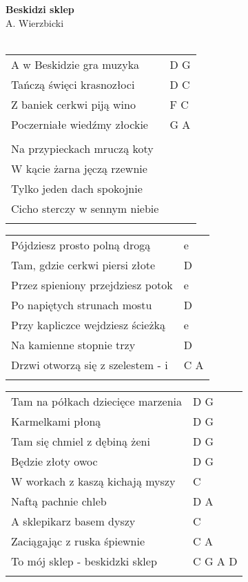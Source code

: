 \documentclass[a5paper]{article}
\begin{document}


\noindent
\fontsize{12pt}{15pt}\selectfont
\textbf{Beskidzi sklep} \\
\fontsize{8pt}{10pt}\selectfont
A. Wierzbicki \\ \\
\fontsize{10pt}{12pt}\selectfont
{}
\begin{tabular}{@{}p{8.5cm}p{3cm}@{}}
A w Beskidzie gra muzyka & D G \\
Tańczą święci krasnozłoci & D C \\
Z baniek cerkwi piją wino & F C \\
Poczerniałe wiedźmy złockie & G A \\ \\
 
Na przypieckach mruczą koty \\
W kącie żarna jęczą rzewnie \\
Tylko jeden dach spokojnie \\
Cicho sterczy w sennym niebie \\ \\
\end{tabular}

\noindent
\begin{tabular}{@{}p{7.5cm}p{3cm}@{}} 
Pójdziesz prosto polną drogą & e \\
Tam, gdzie cerkwi piersi złote & D \\
Przez spieniony przejdziesz potok & e \\
Po napiętych strunach mostu & D \\
Przy kapliczce wejdziesz ścieżką & e \\
Na kamienne stopnie trzy & D \\
Drzwi otworzą się z szelestem - i & C A \\ \\
\end{tabular}

\noindent
\begin{tabular}{@{}p{6.5cm}p{3cm}@{}}
Tam na półkach dziecięce marzenia & D G \\
Karmelkami płoną & D G \\
Tam się chmiel z dębiną żeni & D G \\
Będzie złoty owoc & D G \\
W workach z kaszą kichają myszy & C \\
Naftą pachnie chleb & D A \\
A sklepikarz basem dyszy & C \\
Zaciągając z ruska śpiewnie & C A \\
To mój sklep - beskidzki sklep & C G A D \\ \\
\end{tabular}
\end{document}
